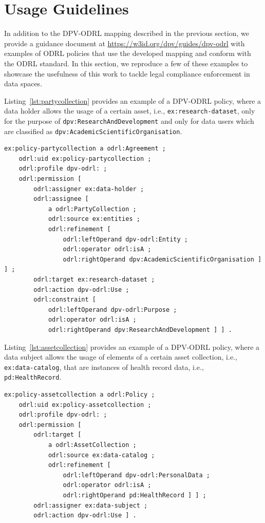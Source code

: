 \section{Usage Guidelines}
\label{sec:guidelines}

In addition to the DPV-ODRL mapping
described in the previous section,
we provide a guidance document 
at \url{https://w3id.org/dpv/guides/dpv-odrl}
with examples of ODRL policies that use the developed mapping
and conform with the ODRL standard.
In this section,
we reproduce a few of these examples to 
showcase the usefulness of this work
to tackle legal compliance enforcement
in data spaces.

Listing~\ref{lst:partycollection}
provides an example of a DPV-ODRL policy,
where a data holder allows the usage of a certain asset,
i.e., \texttt{ex:research-dataset},
only for the purpose of
\texttt{dpv:ResearchAndDevelopment}
and only for data users which are classified as 
\texttt{dpv:AcademicScientificOrganisation}.

\begin{scriptsize}
\begin{lstlisting}[language=turtle, caption=Purpose-restricted agreement with a party collection refinement., label=lst:partycollection]
ex:policy-partycollection a odrl:Agreement ;
    odrl:uid ex:policy-partycollection ;
    odrl:profile dpv-odrl: ;
    odrl:permission [
        odrl:assigner ex:data-holder ;
        odrl:assignee [ 
            a odrl:PartyCollection ;
            odrl:source ex:entities ;
            odrl:refinement [
                odrl:leftOperand dpv-odrl:Entity ;
                odrl:operator odrl:isA ;
                odrl:rightOperand dpv:AcademicScientificOrganisation ] ] ;
        odrl:target ex:research-dataset ;
        odrl:action dpv-odrl:Use ;
        odrl:constraint [
            odrl:leftOperand dpv-odrl:Purpose ;
            odrl:operator odrl:isA ;
            odrl:rightOperand dpv:ResearchAndDevelopment ] ] .
\end{lstlisting}
\end{scriptsize}

Listing~\ref{lst:assetcollection}
provides an example of a DPV-ODRL policy,
where a data subject allows the usage of elements
of a certain asset collection,
i.e., \texttt{ex:data-catalog},
that are instances of health record data,
i.e., \texttt{pd:HealthRecord}.

\begin{scriptsize}
\begin{lstlisting}[language=turtle, caption=Policy with a DPV-ODRL-based asset collection refinement on personal data type., label=lst:assetcollection]
ex:policy-assetcollection a odrl:Policy ;
    odrl:uid ex:policy-assetcollection ;
    odrl:profile dpv-odrl: ;
    odrl:permission [
        odrl:target [ 
            a odrl:AssetCollection ;
            odrl:source ex:data-catalog ;
            odrl:refinement [
                odrl:leftOperand dpv-odrl:PersonalData ;
                odrl:operator odrl:isA ;
                odrl:rightOperand pd:HealthRecord ] ] ;
        odrl:assigner ex:data-subject ;
        odrl:action dpv-odrl:Use ] .
\end{lstlisting}
\end{scriptsize}

